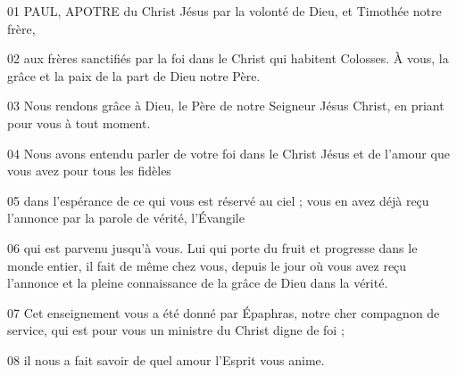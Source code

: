 01 PAUL, APOTRE du Christ Jésus par la volonté de Dieu, et Timothée notre frère,

02 aux frères sanctifiés par la foi dans le Christ qui habitent Colosses. À vous, la grâce et la paix de la part de Dieu notre Père.

03 Nous rendons grâce à Dieu, le Père de notre Seigneur Jésus Christ, en priant pour vous à tout moment.

04 Nous avons entendu parler de votre foi dans le Christ Jésus et de l’amour que vous avez pour tous les fidèles

05 dans l’espérance de ce qui vous est réservé au ciel ; vous en avez déjà reçu l’annonce par la parole de vérité, l’Évangile

06 qui est parvenu jusqu’à vous. Lui qui porte du fruit et progresse dans le monde entier, il fait de même chez vous, depuis le jour où vous avez reçu l’annonce et la pleine connaissance de la grâce de Dieu dans la vérité.

07 Cet enseignement vous a été donné par Épaphras, notre cher compagnon de service, qui est pour vous un ministre du Christ digne de foi ;

08 il nous a fait savoir de quel amour l’Esprit vous anime.
